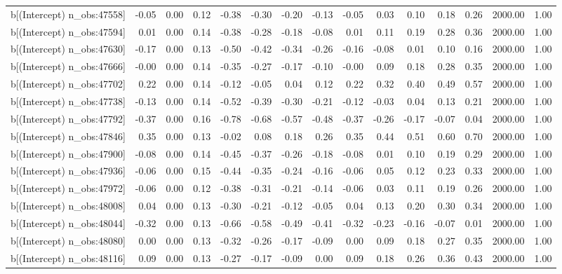 \begin{table}[ht]
\begin{tabular}{rrrrrrrrrrrrrrr}
  b[(Intercept) n\_obs:47558] & -0.05 & 0.00 & 0.12 & -0.38 & -0.30 & -0.20 & -0.13 & -0.05 & 0.03 & 0.10 & 0.18 & 0.26 & 2000.00 & 1.00 \\ 
  b[(Intercept) n\_obs:47594] & 0.01 & 0.00 & 0.14 & -0.38 & -0.28 & -0.18 & -0.08 & 0.01 & 0.11 & 0.19 & 0.28 & 0.36 & 2000.00 & 1.00 \\ 
  b[(Intercept) n\_obs:47630] & -0.17 & 0.00 & 0.13 & -0.50 & -0.42 & -0.34 & -0.26 & -0.16 & -0.08 & 0.01 & 0.10 & 0.16 & 2000.00 & 1.00 \\ 
  b[(Intercept) n\_obs:47666] & -0.00 & 0.00 & 0.14 & -0.35 & -0.27 & -0.17 & -0.10 & -0.00 & 0.09 & 0.18 & 0.28 & 0.35 & 2000.00 & 1.00 \\ 
  b[(Intercept) n\_obs:47702] & 0.22 & 0.00 & 0.14 & -0.12 & -0.05 & 0.04 & 0.12 & 0.22 & 0.32 & 0.40 & 0.49 & 0.57 & 2000.00 & 1.00 \\ 
  b[(Intercept) n\_obs:47738] & -0.13 & 0.00 & 0.14 & -0.52 & -0.39 & -0.30 & -0.21 & -0.12 & -0.03 & 0.04 & 0.13 & 0.21 & 2000.00 & 1.00 \\ 
  b[(Intercept) n\_obs:47792] & -0.37 & 0.00 & 0.16 & -0.78 & -0.68 & -0.57 & -0.48 & -0.37 & -0.26 & -0.17 & -0.07 & 0.04 & 2000.00 & 1.00 \\ 
  b[(Intercept) n\_obs:47846] & 0.35 & 0.00 & 0.13 & -0.02 & 0.08 & 0.18 & 0.26 & 0.35 & 0.44 & 0.51 & 0.60 & 0.70 & 2000.00 & 1.00 \\ 
  b[(Intercept) n\_obs:47900] & -0.08 & 0.00 & 0.14 & -0.45 & -0.37 & -0.26 & -0.18 & -0.08 & 0.01 & 0.10 & 0.19 & 0.29 & 2000.00 & 1.00 \\ 
  b[(Intercept) n\_obs:47936] & -0.06 & 0.00 & 0.15 & -0.44 & -0.35 & -0.24 & -0.16 & -0.06 & 0.05 & 0.12 & 0.23 & 0.33 & 2000.00 & 1.00 \\ 
  b[(Intercept) n\_obs:47972] & -0.06 & 0.00 & 0.12 & -0.38 & -0.31 & -0.21 & -0.14 & -0.06 & 0.03 & 0.11 & 0.19 & 0.26 & 2000.00 & 1.00 \\ 
  b[(Intercept) n\_obs:48008] & 0.04 & 0.00 & 0.13 & -0.30 & -0.21 & -0.12 & -0.05 & 0.04 & 0.13 & 0.20 & 0.30 & 0.34 & 2000.00 & 1.00 \\ 
  b[(Intercept) n\_obs:48044] & -0.32 & 0.00 & 0.13 & -0.66 & -0.58 & -0.49 & -0.41 & -0.32 & -0.23 & -0.16 & -0.07 & 0.01 & 2000.00 & 1.00 \\ 
  b[(Intercept) n\_obs:48080] & 0.00 & 0.00 & 0.13 & -0.32 & -0.26 & -0.17 & -0.09 & 0.00 & 0.09 & 0.18 & 0.27 & 0.35 & 2000.00 & 1.00 \\ 
  b[(Intercept) n\_obs:48116] & 0.09 & 0.00 & 0.13 & -0.27 & -0.17 & -0.09 & 0.00 & 0.09 & 0.18 & 0.26 & 0.36 & 0.43 & 2000.00 & 1.00 \\ 

\end{tabular}
\end{table}
